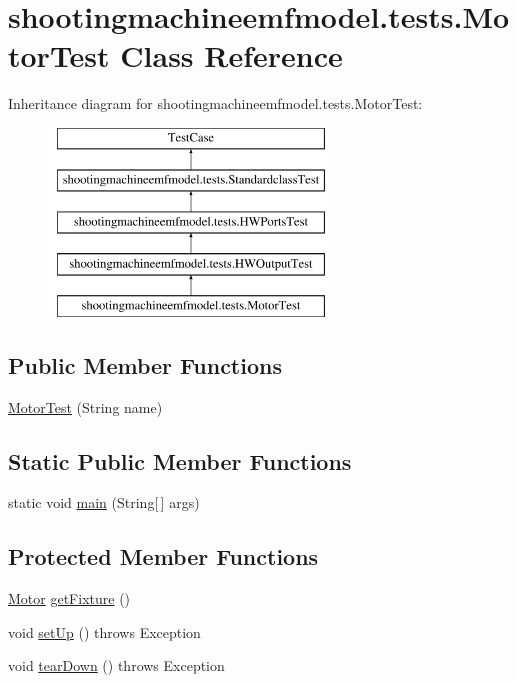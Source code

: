 \hypertarget{classshootingmachineemfmodel_1_1tests_1_1_motor_test}{\section{shootingmachineemfmodel.\-tests.\-Motor\-Test Class Reference}
\label{classshootingmachineemfmodel_1_1tests_1_1_motor_test}
}
Inheritance diagram for shootingmachineemfmodel.\-tests.\-Motor\-Test\-:\begin{figure}[H]
\begin{center}
\leavevmode
\includegraphics[height=5.000000cm]{classshootingmachineemfmodel_1_1tests_1_1_motor_test}
\end{center}
\end{figure}
\subsection*{Public Member Functions}
\begin{DoxyCompactItemize}
\item 
\hyperlink{classshootingmachineemfmodel_1_1tests_1_1_motor_test_a7d9cc9f39da0739a84cedc2a82d95a1c}{Motor\-Test} (String name)
\end{DoxyCompactItemize}
\subsection*{Static Public Member Functions}
\begin{DoxyCompactItemize}
\item 
static void \hyperlink{classshootingmachineemfmodel_1_1tests_1_1_motor_test_a01aeb931d37d529958d822dac80817d9}{main} (String\mbox{[}$\,$\mbox{]} args)
\end{DoxyCompactItemize}
\subsection*{Protected Member Functions}
\begin{DoxyCompactItemize}
\item 
\hyperlink{interfaceshootingmachineemfmodel_1_1_motor}{Motor} \hyperlink{classshootingmachineemfmodel_1_1tests_1_1_motor_test_a268e8fe248737106aa470f2cf7f3c119}{get\-Fixture} ()
\item 
void \hyperlink{classshootingmachineemfmodel_1_1tests_1_1_motor_test_a44f5374a823109346bd63b63ed37c7b7}{set\-Up} ()  throws Exception 
\item 
void \hyperlink{classshootingmachineemfmodel_1_1tests_1_1_motor_test_a02a7629348e574e5e5cad933432cd630}{tear\-Down} ()  throws Exception 
\end{DoxyCompactItemize}
